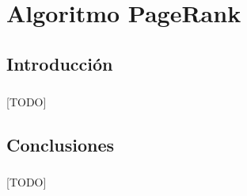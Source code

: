 \documentclass{subfiles}
\begin{document}
  \chapter{Algoritmo PageRank}
  \label{chap:graphs}

    \section{Introducción}
    \label{sec:pagerank_intro}

      \paragraph{}
      [TODO]

    \section{Conclusiones}
    \label{sec:pagerank_conclusions}

      \paragraph{}
      [TODO]
\end{document}
